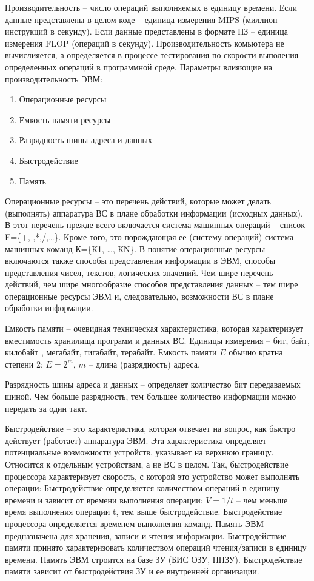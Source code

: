 \documentclass[unicode, 12pt, a4paper, oneside]{article}
\begin{document}
Производительность – число операций выполняемых в единицу времени. Если данные представлены в целом коде – единица измерения MIPS (миллион инструкций в секунду). Если данные представлены в  формате ПЗ – единица измерения FLOP (операций в секунду). Производительность комьютера не вычислияется, а определяется в процессе тестирования по скорости выполения определенных операций в программной среде.
Параметры влияющие на производительность ЭВМ: 
\begin{enumerate}
\item Операционные ресурсы
\item Емкость памяти ресурсы
\item Разрядность шины адреса и данных
\item Быстродействие
\item Память
\end{enumerate}

Операционные ресурсы – это перечень действий, которые может делать (выполнять) аппаратура ВС в плане обработки информации (исходных данных). В этот перечень прежде всего включается система машинных операций – список F=\{+,-,*,/,…\}. Кроме того, это порождающая ее (систему операций) система машинных команд К=\{К1, …, КN\}. В понятие операционные ресурсы включаются также способы представления информации в ЭВМ, способы представления чисел, текстов, логических значений. Чем шире перечень действий, чем шире многообразие способов представления данных – тем шире операционные ресурсы ЭВМ и, следовательно, возможности ВС в плане обработки информации.

Емкость памяти – очевидная техническая характеристика, которая характеризует вместимость хранилища программ и данных ВС. Единицы измерения – бит,  байт,  килобайт , мегабайт,  гигабайт, терабайт.  Емкость  памяти $ E $ обычно  кратна степени 2: $ E = 2^{m}$, $ m $ – длина (разрядность) адреса.

Разрядность шины адреса и данных – определяет количество бит передаваемых шиной. Чем больше разрядность, тем большее количество информации можно передать за один такт.

Быстродействие – это характеристика, которая отвечает на вопрос, как быстро действует (работает) аппаратура ЭВМ. Эта характеристика определяет потенциальные возможности устройств, указывает на верхнюю границу. Относится к отдельным устройствам, а не ВС в целом. Так, быстродействие процессора характеризует скорость, с которой это устройство может выполнять операции: Быстродействие определяется количеством операций в единицу времени и зависит от времени выполнения операции: $ V=1/t $ – чем меньше время выполнения операции t, тем выше быстродействие. Быстродействие процессора определяется временем выполнения команд. Память ЭВМ предназначена для хранения, записи и чтения информации. Быстродействие памяти принято характеризовать количеством операций чтения/записи в единицу времени. Память ЭВМ строится на базе ЗУ (БИС ОЗУ, ППЗУ). Быстродействие памяти зависит от быстродействия ЗУ и ее внутренней организации. 
\end{document}
